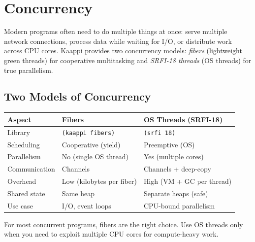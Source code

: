 \chapter{Concurrency}
\label{ch:concurrency}

Modern programs often need to do multiple things at once: serve multiple network connections, process data while waiting for I/O, or distribute work across CPU cores. Kaappi provides two concurrency models: \emph{fibers} (lightweight green threads) for cooperative multitasking and \emph{SRFI-18 threads} (OS threads) for true parallelism.

\section{Two Models of Concurrency}

\begin{center}
\begin{tabular}{lp{3.5cm}p{3.5cm}}
\textbf{Aspect} & \textbf{Fibers} & \textbf{OS Threads (SRFI-18)} \\
\hline
Library & \texttt{(kaappi fibers)} & \texttt{(srfi 18)} \\
Scheduling & Cooperative (yield) & Preemptive (OS) \\
Parallelism & No (single OS thread) & Yes (multiple cores) \\
Communication & Channels & Channels + deep-copy \\
Overhead & Low (kilobytes per fiber) & High (VM + GC per thread) \\
Shared state & Same heap & Separate heaps (safe) \\
Use case & I/O, event loops & CPU-bound parallelism \\
\end{tabular}
\end{center}

For most concurrent programs, fibers are the right choice. Use OS threads only when you need to exploit multiple CPU cores for compute-heavy work.

\begin{center}
\end{center}

